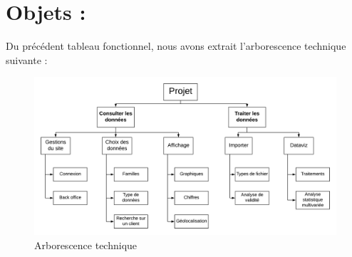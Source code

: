 \section{Objets :}

Du précédent tableau fonctionnel, nous avons extrait l'arborescence technique suivante :
\begin{figure}[h]
	\begin{center}
		\includegraphics[scale=0.6]{img/ArborescenceTechnique.png}
		\caption{Arborescence technique}
	\end{center}
\end{figure}